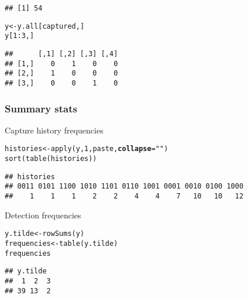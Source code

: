 \documentclass[color=usenames,dvipsnames]{beamer}\usepackage[]{graphicx}\usepackage[]{color}
\makeatletter
\newcommand{\hlnum}[1]{\textcolor[rgb]{0.69,0.494,0}{#1}}%
\newcommand{\hlstr}[1]{\textcolor[rgb]{0.749,0.012,0.012}{#1}}%
\newcommand{\hlopt}[1]{\textcolor[rgb]{0,0,0}{#1}}%
\newcommand{\hlstd}[1]{\textcolor[rgb]{0,0,0}{#1}}%
\newcommand{\hlkwb}[1]{\textcolor[rgb]{0,0.341,0.682}{#1}}%
\newcommand{\hlkwc}[1]{\textcolor[rgb]{0,0,0}{\textbf{#1}}}%
\newcommand{\hlkwd}[1]{\textcolor[rgb]{0.004,0.004,0.506}{#1}}%
\newenvironment{kframe}{%
 \def\at@end@of@kframe{}%
 \ifinner\ifhmode%
  \def\at@end@of@kframe{\end{minipage}}%
  \begin{minipage}{\columnwidth}%
 \fi\fi%
 \def\FrameCommand##1{\hskip\@totalleftmargin \hskip-\fboxsep
 \colorbox{shadecolor}{##1}\hskip-\fboxsep
     \hskip-\linewidth \hskip-\@totalleftmargin \hskip\columnwidth}%
 \MakeFramed {\advance\hsize-\width
   \@totalleftmargin\z@ \linewidth\hsize
   \@setminipage}}%
 {\par\unskip\endMakeFramed%
 \at@end@of@kframe}
\newenvironment{knitrout}{}{} %
\makeatother
\begin{document}
\begin{frame}[fragile]
\begin{knitrout}
\begin{kframe}
\begin{alltt}
\end{alltt}
\begin{verbatim}
## [1] 54
\end{verbatim}
\begin{alltt}
\hlstd{y} \hlkwb{<-} \hlstd{y.all[captured,]}
\hlstd{y[}\hlnum{1}\hlopt{:}\hlnum{3}\hlstd{,]}
\end{alltt}
\begin{verbatim}
##      [,1] [,2] [,3] [,4]
## [1,]    0    1    0    0
## [2,]    1    0    0    0
## [3,]    0    0    1    0
\end{verbatim}
\end{kframe}
\end{knitrout}
\end{frame}



\begin{frame}[fragile]
  \frametitle{Summary stats}
  Capture history frequencies
\begin{knitrout}\scriptsize
{}\color{fgcolor}\begin{kframe}
\begin{alltt}
\hlstd{histories} \hlkwb{<-} \hlkwd{apply}\hlstd{(y,} \hlnum{1}\hlstd{, paste,} \hlkwc{collapse}\hlstd{=}\hlstr{""}\hlstd{)}
\hlkwd{sort}\hlstd{(}\hlkwd{table}\hlstd{(histories))}
\end{alltt}
\begin{verbatim}
## histories
## 0011 0101 1100 1010 1101 0110 1001 0001 0010 0100 1000 
##    1    1    1    2    2    4    4    7   10   10   12
\end{verbatim}
\end{kframe}
\end{knitrout}
\pause
\vfill
  Detection frequencies
\begin{knitrout}\scriptsize
{}\color{fgcolor}\begin{kframe}
\begin{alltt}
\hlstd{y.tilde} \hlkwb{<-} \hlkwd{rowSums}\hlstd{(y)}
\hlstd{frequencies} \hlkwb{<-} \hlkwd{table}\hlstd{(y.tilde)}
\hlstd{frequencies}
\end{alltt}
\begin{verbatim}
## y.tilde
##  1  2  3 
## 39 13  2
\end{verbatim}
\end{kframe}
\end{knitrout}
\end{frame}
\end{document}
